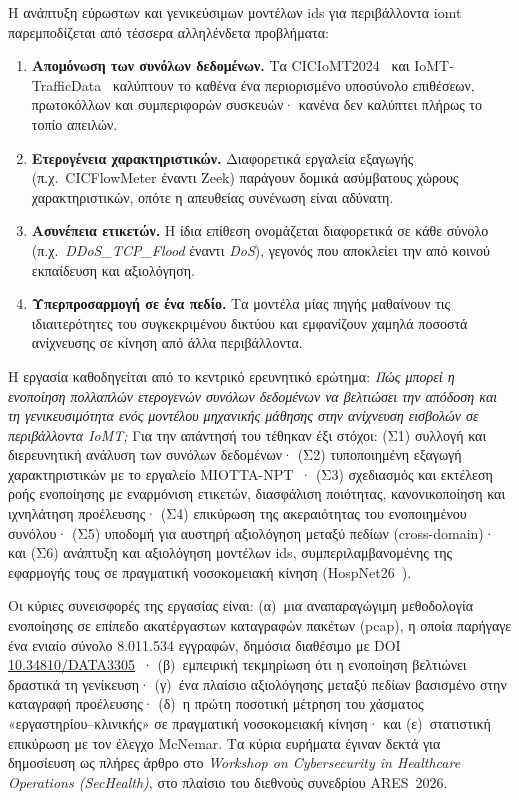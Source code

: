 Η ανάπτυξη εύρωστων και γενικεύσιμων μοντέλων \gls{ids} για περιβάλλοντα \gls{iomt} παρεμποδίζεται από τέσσερα αλληλένδετα προβλήματα:
\begin{enumerate}[leftmargin=*, label=\textbf{Π\arabic*.}, nosep]
  \item \textbf{Απομόνωση των συνόλων δεδομένων.} Τα CICIoMT2024~\cite{dadkhah2024ciciomt} και IoMT-TrafficData~\cite{areia2024iomt} καλύπτουν το καθένα ένα περιορισμένο υποσύνολο επιθέσεων, πρωτοκόλλων και συμπεριφορών συσκευών· κανένα δεν καλύπτει πλήρως το τοπίο απειλών.
  \item \textbf{Ετερογένεια χαρακτηριστικών.} Διαφορετικά εργαλεία εξαγωγής (π.χ.\ CICFlowMeter έναντι Zeek) παράγουν δομικά ασύμβατους χώρους χαρακτηριστικών, οπότε η απευθείας συνένωση είναι αδύνατη.
  \item \textbf{Ασυνέπεια ετικετών.} Η ίδια επίθεση ονομάζεται διαφορετικά σε κάθε σύνολο (π.χ.\ \textit{DDoS\_TCP\_Flood} έναντι \textit{DoS}), γεγονός που αποκλείει την από κοινού εκπαίδευση και αξιολόγηση.
  \item \textbf{Υπερπροσαρμογή σε ένα πεδίο.} Τα μοντέλα μίας πηγής μαθαίνουν τις ιδιαιτερότητες του συγκεκριμένου δικτύου και εμφανίζουν χαμηλά ποσοστά ανίχνευσης σε κίνηση από άλλα περιβάλλοντα.
\end{enumerate}


Η εργασία καθοδηγείται από το κεντρικό ερευνητικό ερώτημα: \textit{Πώς μπορεί η ενοποίηση πολλαπλών ετερογενών συνόλων δεδομένων να βελτιώσει την απόδοση και τη γενικευσιμότητα ενός μοντέλου μηχανικής μάθησης στην ανίχνευση εισβολών σε περιβάλλοντα IoMT;} Για την απάντησή του τέθηκαν έξι στόχοι: (Σ1) συλλογή και διερευνητική ανάλυση των συνόλων δεδομένων· (Σ2) τυποποιημένη εξαγωγή χαρακτηριστικών με το εργαλείο MIOTTA-NPT~\cite{leon2025miotta}· (Σ3) σχεδιασμός και εκτέλεση ροής ενοποίησης με εναρμόνιση ετικετών, διασφάλιση ποιότητας, κανονικοποίηση και ιχνηλάτηση προέλευσης· (Σ4) επικύρωση της ακεραιότητας του ενοποιημένου συνόλου· (Σ5) υποδομή για αυστηρή αξιολόγηση μεταξύ πεδίων (cross-domain)· και (Σ6) ανάπτυξη και αξιολόγηση μοντέλων \gls{ids}, συμπεριλαμβανομένης της εφαρμογής τους σε πραγματική νοσοκομειακή κίνηση (HospNet26~\cite{hospnet26}).


Οι κύριες συνεισφορές της εργασίας είναι: (α)~μια αναπαραγώγιμη μεθοδολογία ενοποίησης σε επίπεδο ακατέργαστων καταγραφών πακέτων (\gls{pcap}), η οποία παρήγαγε ένα ενιαίο σύνολο 8.011.534 εγγραφών, δημόσια διαθέσιμο με DOI \href{https://doi.org/10.34810/DATA3305}{10.34810/DATA3305}~\cite{unified_iomt_csuc2026}· (β)~εμπειρική τεκμηρίωση ότι η ενοποίηση βελτιώνει δραστικά τη γενίκευση· (γ)~ένα πλαίσιο αξιολόγησης μεταξύ πεδίων βασισμένο στην καταγραφή προέλευσης· (δ)~η πρώτη ποσοτική μέτρηση του χάσματος «εργαστηρίου--κλινικής» σε πραγματική νοσοκομειακή κίνηση· και (ε)~στατιστική επικύρωση με τον έλεγχο McNemar. Τα κύρια ευρήματα έγιναν δεκτά για δημοσίευση ως πλήρες άρθρο στο \textit{Workshop on Cybersecurity in Healthcare Operations (SecHealth)}, στο πλαίσιο του διεθνούς συνεδρίου ARES~2026.

